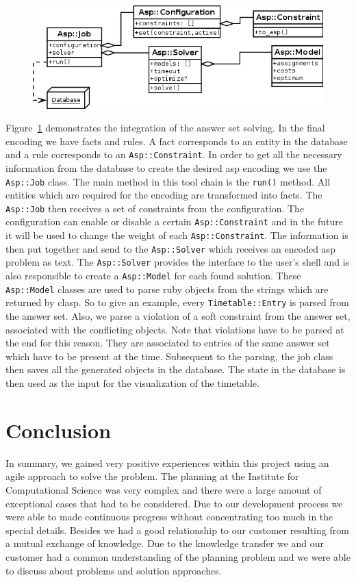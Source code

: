 \documentclass[12pt]{article} %
\newcommand{\job}{\texttt{Asp::Job}}
\newcommand{\model}{\texttt{Asp::Model}}
\newcommand{\solver}{\texttt{Asp::Solver}}
\newcommand{\constraint}{\texttt{Asp::Constraint}}
\newcommand{\entry}{\texttt{Timetable::Entry}}
\newcommand{\run}{\texttt{run()}}
\begin{document}
\begin{figure}[h]
    \includegraphics[width=\textwidth]{Images/AspClassDiagram.png}
    \label{fig:class_diagram}
\end{figure}

Figure~\ref{fig:class_diagram} demonstrates the integration of the answer set solving.
In the final encoding we have facts and rules.
A fact corresponds to an entity in the database and a rule corresponds to an \constraint{}.
In order to get all the necessary information from the database to create the desired asp encoding we use the \job{} class.
The main method in this tool chain is the \run{} method.
All entities which are required for the encoding are transformed into facts.
The \job{} then receives a set of constraints from the configuration.
The configuration can enable or disable a certain \constraint{} and in the future it will be used to change the weight of each \constraint{}.
The information is then put together and send to the \solver{} which receives an encoded asp problem as text.
The \solver{} provides the interface to the user's shell and is also responsible to create a \model{} for each found solution.
These \model{} classes are used to parse ruby objects from the strings which are returned by clasp.
So to give an example, every \entry{} is parsed from the answer set.
Also, we parse a violation of a soft constraint from the answer set, associated with the conflicting objects.
Note that violations have to be parsed at the end for this reason.
They are associated to entries of the same answer set which have to be present at the time.
Subsequent to the parsing, the job class then saves all the generated objects in the database.
The state in the database is then used as the input for the visualization of the timetable.

\section{Conclusion}

In summary, we gained very positive experiences within this project using an agile approach to solve the problem.
The planning at the Institute for Computational Science was very complex and there were a large amount of exceptional cases that had to be considered.
Due to our development process we were able to made continuous progress without concentrating too much in the special details.
Besides we had a good relationship to our customer resulting from a mutual exchange of knowledge.
Due to the knowledge transfer we and our customer had a common understanding of the planning problem and we were able to discuss about problems and solution approaches.
\end{document}
